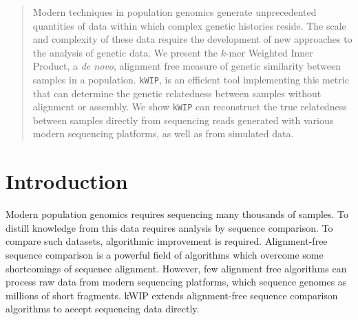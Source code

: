 \documentclass[a0,portrait]{a0poster}
\begin{document}
\begin{multicols}{2}


\begin{abstract}
\vspace{5mm}

Modern techniques in population genomics generate unprecedented quantities of
data within which complex genetic histories reside. The scale and complexity of
these data require the development of new approaches to the analysis of genetic
data. We present the $k$-mer Weighted Inner Product, a \textit{de novo},
alignment free measure of genetic similarity between samples in a population.
\texttt{kWIP}, is an efficient tool implementing this metric that can determine
the genetic relatedness between samples without alignment or assembly. We show
\texttt{kWIP} can reconstruct the true relatedness between samples directly
from sequencing reads generated with various modern sequencing platforms, as
well as from simulated data.

\end{abstract}


\section*{Introduction}

Modern population genomics requires sequencing many thousands of samples. To
distill knowledge from this data requires analysis by sequence comparison. To
compare such datasets, algorithmic improvement is required. Alignment-free
sequence comparison is a powerful field of algorithms which overcome some
shortcomings of sequence alignment. However, few alignment free algorithms can
process raw data from modern sequencing platforms, which sequence genomes as
millions of short fragments. kWIP extends alignment-free sequence comparison
algorithms to accept sequencing data directly.



\end{multicols}
\end{document}
